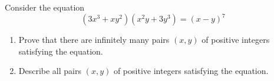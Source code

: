 \usepackage{enumitem}

Consider the equation \[(3x^3+xy^2)(x^2y+3y^3)=(x-y)^7\]
\begin{enumerate}[label=(\alph*)]
	\item Prove that there are infinitely many pairs $(x,y)$ of positive integers satisfying the equation.
	\item Describe all pairs $(x,y)$ of positive integers satisfying the equation.
\end{enumerate}